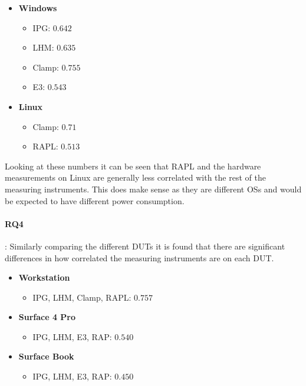 \begin{itemize}
    \item \textbf{Windows}
    \begin{itemize}
        \item IPG: $0.642$ %
        \item LHM: $0.635$ %
        \item Clamp: $0.755$ %
        \item E3: $0.543$ %
    \end{itemize}
    \item \textbf{Linux}
    \begin{itemize}
        \item Clamp: $0.71$ %
        \item RAPL: $0.513$ %
    \end{itemize}
\end{itemize}

Looking at these numbers it can be seen that RAPL and the hardware measurements on Linux are generally less correlated with the rest of the measuring instruments. This does make sense as they are different OSs and would be expected to have different power consumption.

\paragraph{RQ4}: Similarly comparing the different DUTs it is found that there are significant differences in how correlated the measuring instruments are on each DUT.

\begin{itemize}
    \item \textbf{Workstation}
    \begin{itemize}
        \item IPG, LHM, Clamp, RAPL: $0.757$%
    \end{itemize}
    \item \textbf{Surface 4 Pro}
    \begin{itemize}
        \item IPG, LHM, E3, RAP: $0.540$%
    \end{itemize}
    \item \textbf{Surface Book}
    \begin{itemize}
        \item IPG, LHM, E3, RAP: $0.450$ %
    \end{itemize}
\end{itemize}

